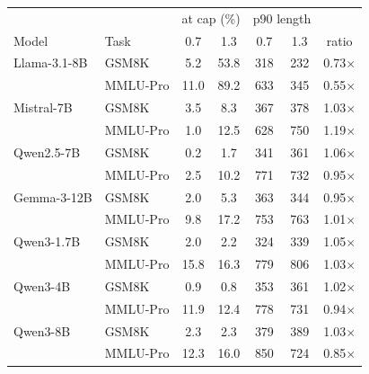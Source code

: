 \begin{tabular}{llccccc}
\toprule
 & & \multicolumn{2}{c}{at cap (\%)} & \multicolumn{2}{c}{p90 length} & \\
Model & Task & 0.7 & 1.3 & 0.7 & 1.3 & ratio \\
\midrule
Llama-3.1-8B & GSM8K & 5.2 & 53.8 & 318 & 232 & 0.73$\times$ \\
 & MMLU-Pro & 11.0 & 89.2 & 633 & 345 & 0.55$\times$ \\
\midrule
Mistral-7B & GSM8K & 3.5 & 8.3 & 367 & 378 & 1.03$\times$ \\
 & MMLU-Pro & 1.0 & 12.5 & 628 & 750 & 1.19$\times$ \\
\midrule
Qwen2.5-7B & GSM8K & 0.2 & 1.7 & 341 & 361 & 1.06$\times$ \\
 & MMLU-Pro & 2.5 & 10.2 & 771 & 732 & 0.95$\times$ \\
\midrule
Gemma-3-12B & GSM8K & 2.0 & 5.3 & 363 & 344 & 0.95$\times$ \\
 & MMLU-Pro & 9.8 & 17.2 & 753 & 763 & 1.01$\times$ \\
\midrule
Qwen3-1.7B & GSM8K & 2.0 & 2.2 & 324 & 339 & 1.05$\times$ \\
 & MMLU-Pro & 15.8 & 16.3 & 779 & 806 & 1.03$\times$ \\
\midrule
Qwen3-4B & GSM8K & 0.9 & 0.8 & 353 & 361 & 1.02$\times$ \\
 & MMLU-Pro & 11.9 & 12.4 & 778 & 731 & 0.94$\times$ \\
\midrule
Qwen3-8B & GSM8K & 2.3 & 2.3 & 379 & 389 & 1.03$\times$ \\
 & MMLU-Pro & 12.3 & 16.0 & 850 & 724 & 0.85$\times$ \\
\bottomrule
\end{tabular}
